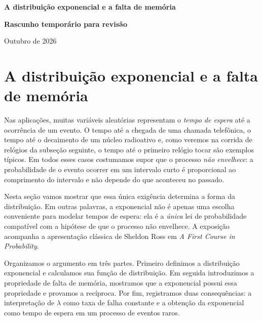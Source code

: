 \renewcommand{\sin}{\operatorname{sen}}



\begin{center}
{\LARGE\bf A distribuição exponencial e a falta de memória}
\vspace{0.3cm}

{\large\bf Rascunho temporário para revisão}
\vspace{0.3cm}

{\footnotesize Outubro de 2026}
\end{center}

\vspace{0.4cm}


\section{A distribuição exponencial e a falta de memória}
\label{sec:exponencial-falta-memoria}

Nas aplicações, muitas variáveis aleatórias representam o \emph{tempo de
espera} até a ocorrência de um evento. O tempo até a chegada de uma chamada
telefônica, o tempo até o decaimento de um núcleo radioativo e, como veremos
na corrida de relógios da subseção seguinte, o tempo até o primeiro relógio
tocar são exemplos típicos. Em todos esses casos costumamos supor que o
processo \emph{não envelhece}: a probabilidade de o evento ocorrer em um
intervalo curto é proporcional ao comprimento do intervalo e não depende do
que aconteceu no passado.

Nesta seção vamos mostrar que essa única exigência determina a forma da
distribuição. Em outras palavras, a exponencial não é apenas uma escolha
conveniente para modelar tempos de espera: ela é a \emph{única} lei de
probabilidade compatível com a hipótese de que o processo não envelhece.
A exposição acompanha a apresentação clássica de Sheldon Ross em
\emph{A First Course in Probability}.

Organizamos o argumento em três partes. Primeiro definimos a distribuição
exponencial e calculamos sua função de distribuição. Em seguida introduzimos
a propriedade de falta de memória, mostramos que a exponencial possui essa
propriedade e provamos a recíproca. Por fim, registramos duas consequências: a
interpretação de $\lambda$ como taxa de falha constante e a obtenção da
exponencial como tempo de espera em um processo de eventos raros.

